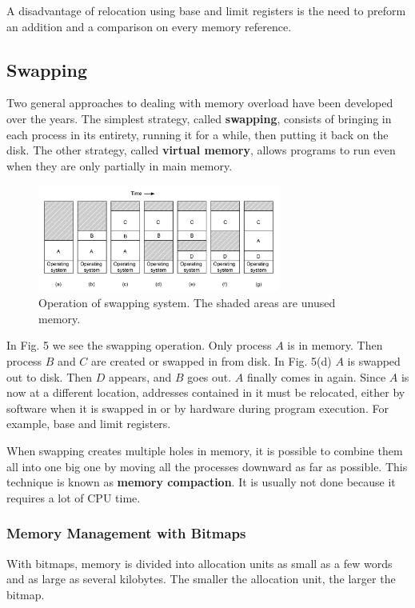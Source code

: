 \documentclass[11pt,a4paper]{article}
\begin{document}
A disadvantage of relocation using base and limit registers is the need to preform an addition and a comparison on every memory reference.

\subsection{Swapping}
Two general approaches to dealing with memory overload have been developed over the years. The simplest strategy, called \textbf{swapping}, consists of bringing in each process in its entirety, running it for a while, then putting it back on the disk. The other strategy, called \textbf{virtual memory}, allows programs to run even when they are only partially in main memory.

\begin{figure}[h!]
	\centering
		\includegraphics[width=300px]{img/memall-01.png}
	\caption{Operation of swapping system. The shaded areas are unused memory.}
\end{figure}

In Fig. 5 we see the swapping operation. Only process $A$ is in memory. Then process $B$ and $C$ are created or swapped in from disk. In Fig. 5(d) $A$ is swapped out to disk. Then $D$ appears, and $B$ goes out. $A$ finally comes in again. Since $A$ is now at a different location, addresses contained in it must be relocated, either by software when it is swapped in or by hardware during program execution. For example, base and limit registers. 

When swapping creates multiple holes in memory, it is possible to combine them all into one big one by moving all the processes downward as far as possible. This technique is known as \textbf{memory compaction}. It is usually not done because it requires a lot of CPU time.

\subsubsection{Memory Management with Bitmaps}
With bitmaps, memory is divided into allocation units as small as a few words and as large as several kilobytes. The smaller the allocation unit, the larger the bitmap.
\end{document}
